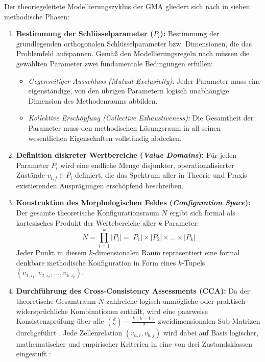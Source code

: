 Der theoriegeleitete Modellierungszyklus der GMA gliedert sich nach \textcite[S.~82 bis 89]{Z6N6V5L9} in sieben methodische Phasen:
\begin{enumerate}[label=\textbf{Phase \arabic*:}, leftmargin=*]
  \item \textbf{Bestimmung der Schlüsselparameter ($P_i$):} Bestimmung der grundlegenden orthogonalen Schlüsselparameter bzw. Dimensionen, die das Problemfeld aufspannen. Gemäß den Modellierungsregeln nach \textcite[S.~82 bis 83]{Z6N6V5L9} müssen die gewählten Parameter zwei fundamentale Bedingungen erfüllen:
  \begin{itemize}[leftmargin=*]
    \item \textit{Gegenseitiger Ausschluss (Mutual Exclusivity):} Jeder Parameter muss eine eigenständige, von den übrigen Parametern logisch unabhängige Dimension des Methodenraums abbilden.
    \item \textit{Kollektive Erschöpfung (Collective Exhaustiveness):} Die Gesamtheit der Parameter muss den methodischen Lösungsraum in all seinen wesentlichen Eigenschaften vollständig abdecken.
  \end{itemize}
  \item \textbf{Definition diskreter Wertbereiche (\textit{Value Domains}):} Für jeden Parameter $P_i$ wird eine endliche Menge disjunkter, operationalisierter Zustände $v_{i,j} \in P_i$ definiert, die das Spektrum aller in Theorie und Praxis existierenden Ausprägungen erschöpfend beschreiben.
  \item \textbf{Konstruktion des Morphologischen Feldes (\textit{Configuration Space}):} Der gesamte theoretische Konfigurationsraum $N$ ergibt sich formal als kartesisches Produkt der Wertebereiche aller $k$ Parameter:
  \begin{equation}
    N = \prod_{i=1}^{k} |P_i| = |P_1| \times |P_2| \times \dots \times |P_k|
  \end{equation}
  Jeder Punkt in diesem $k$-dimensionalen Raum repräsentiert eine formal denkbare methodische Konfiguration in Form eines $k$-Tupels $(v_{1,i_1}, v_{2,i_2}, \dots, v_{k,i_k})$.
  \item \textbf{Durchführung des Cross-Consistency Assessments (CCA):} Da der theoretische Gesamtraum $N$ zahlreiche logisch unmögliche oder praktisch widersprüchliche Kombinationen enthält, wird eine paarweise Konsistenzprüfung über alle $\binom{k}{2} = \frac{k(k-1)}{2}$ zweidimensionalen Sub-Matrizen durchgeführt \parencite[S.~83 bis 86]{Z6N6V5L9}. Jede Zellenrelation $(v_{a,i}, v_{b,j})$ wird dabei auf Basis logischer, mathematischer und empirischer Kriterien in eine von drei Zustandsklassen eingestuft \parencite[S.~83 bis 91]{Z6N6V5L9}:

\end{enumerate}
